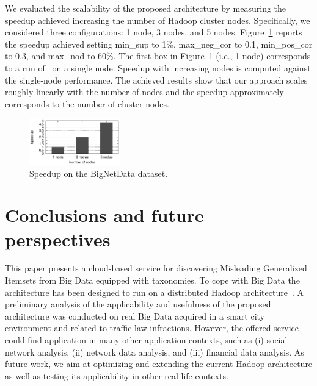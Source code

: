 We evaluated the scalability of the proposed architecture by measuring the speedup achieved increasing the number of Hadoop cluster nodes.
Specifically, we considered three configurations: 1 node, 3 nodes, and 5 nodes.
Figure~\ref{fig:speedup} reports the speedup achieved setting min\_sup to 1\%, max\_neg\_cor to 0.1, min\_pos\_cor to 0.3, and 
max\_nod to 60\%. 
The first box in Figure~\ref{fig:speedup} (i.e., 1 node) corresponds
to a run of \SeTAB\ on a single node. Speedup with increasing nodes is computed against the single-node performance. 
The achieved results show that our approach scales roughly linearly with the number of nodes and the speedup 
approximately corresponds to the number of cluster nodes. 

\begin{figure}[t]
\centering
\includegraphics[width=0.35\textwidth]{chapters/mgi/grafici/graficoSpeedup.eps}
\caption{Speedup on the BigNetData dataset.}
\label{fig:speedup}
\end{figure}


\section{Conclusions and future perspectives}
\label{conclusion}
This paper presents a cloud-based service for discovering Misleading Generalized Itemsets from Big Data equipped with taxonomies.
To cope with Big Data the architecture has been designed to run on a distributed Hadoop architecture~\cite{Dean2008}.
A preliminary analysis of the applicability and usefulness of the proposed architecture was conducted on real Big Data 
acquired in a smart city environment and related to traffic law infractions.
However, the offered service could find application in many other application contexts, such as (i) social network analysis, 
(ii) network data analysis, and (iii) financial data analysis. 
As future work, we aim at optimizing and extending the current Hadoop architecture as well as testing its applicability in other real-life contexts. 
